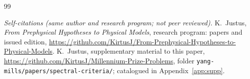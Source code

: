 \begin{thebibliography}{99}
\medskip
\item[] \emph{Self-citations (same author and research program; not peer reviewed).}
 K.~Justus, \emph{From Prephysical Hypotheses to Physical Models}, research program: papers and
issued edition, \url{https://github.com/KirtusJ/From-Prephysical-Hypotheses-to-Physical-Models}.
 K.~Justus, supplementary material to this paper,
\url{https://github.com/KirtusJ/Millennium-Prize-Problems}, folder
\texttt{yang-mills/papers/spectral-criteria/}; catalogued in Appendix~\ref{app:supp}.
\end{thebibliography}

